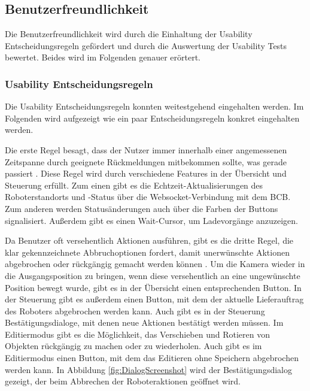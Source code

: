 \subsection{Benutzerfreundlichkeit}
Die Benutzerfreundlichkeit wird durch die Einhaltung der Usability Entscheidungsregeln gefördert und durch die Auswertung der Usability Tests bewertet. Beides wird im Folgenden genauer erörtert.

\subsubsection{Usability Entscheidungsregeln}\label{sec:UsabilityHeuristics}
Die Usability Entscheidungsregeln konnten weitestgehend eingehalten werden. Im Folgenden wird aufgezeigt wie ein paar Entscheidungsregeln konkret eingehalten werden.

Die erste Regel besagt, dass der Nutzer immer innerhalb einer angemessenen Zeitspanne durch geeignete Rückmeldungen mitbekommen sollte, was gerade passiert \cite[Regel 1]{Nielsen.1994}. Diese Regel wird durch verschiedene Features in der Übersicht und Steuerung erfüllt. Zum einen gibt es die Echtzeit-Aktualisierungen des Roboterstandorts und -Status über die \gls{Websocket}-Verbindung mit dem \ac{BCB}. Zum anderen werden Statusänderungen auch über die Farben der Buttons signalisiert. Außerdem gibt es einen Wait-Cursor, um Ladevorgänge anzuzeigen.


Da Benutzer oft versehentlich Aktionen ausführen, gibt es die dritte Regel, die klar gekennzeichnete Abbruchoptionen fordert, damit unerwünschte Aktionen abgebrochen oder rückgängig gemacht werden können \cite[Regel 3]{Nielsen.1994}. Um die Kamera wieder in die Ausgangsposition zu bringen, wenn diese versehentlich an eine ungewünschte Position bewegt wurde, gibt es in der Übersicht einen entsprechenden Button. In der Steuerung gibt es außerdem einen Button, mit dem der aktuelle Lieferauftrag des Roboters abgebrochen werden kann. Auch gibt es in der Steuerung Bestätigungsdialoge, mit denen neue Aktionen bestätigt werden müssen. Im Editiermodus gibt es die Möglichkeit, das Verschieben und Rotieren von Objekten rückgängig zu machen oder zu wiederholen. Auch gibt es im Editiermodus einen Button, mit dem das Editieren ohne Speichern abgebrochen werden kann. In Abbildung \ref{fig:DialogScreenshot} wird der Bestätigungsdialog gezeigt, der beim Abbrechen der Roboteraktionen geöffnet wird.

